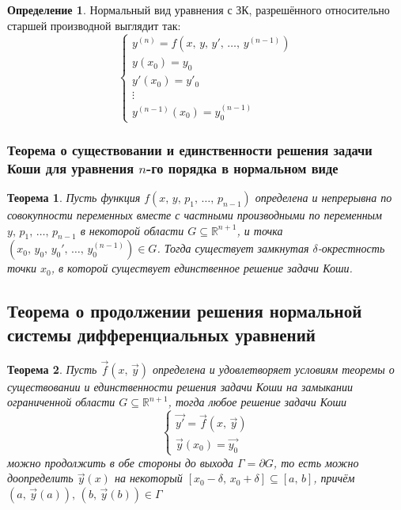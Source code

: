 \documentclass[a4paper,12pt]{article}
\theoremstyle{plain}
\newtheorem{theorem}{Теорема}[section]
\theoremstyle{definition}
\newtheorem{definition}{Определение}[section]
\theoremstyle{remark}
\begin{document}
\begin{definition}
	Нормальный вид уравнения с ЗК, разрешённого относительно старшей производной выглядит так:
	\[
		\begin{cases}
			y^{(n)} = f(x,\,y,\,y',\,\ldots,\,y^{(n-1)}) \\
			y(x_0) = y_0                                 \\
			y'(x_0) = y'_0                               \\
			\vdots                                       \\
			y^{(n - 1)}(x_0) = y^{(n-1)}_0
		\end{cases}
	\]
\end{definition}

\subsubsection*{Теорема о существовании и единственности решения задачи Коши для уравнения $n$-го порядка в нормальном виде}
\begin{theorem}
	Пусть функция $f(x,\,y,\,p_1,\,\ldots,\,p_{n-1})$ определена и непрерывна по совокупности переменных вместе с частными производными по переменным $y,\,p_1,\,\ldots,\,p_{n - 1}$ в некоторой области $G \subseteq \mathbb{R}^{n + 1}$, и точка $(x_0,\,y_0,\,y_0',\,\ldots,\,y^{(n-1)}_0) \in G$. Тогда существует замкнутая $\delta$-окрестность точки $x_0$, в которой существует единственное решение задачи Коши.
\end{theorem}

\subsection{Теорема о продолжении решения нормальной системы дифференциальных уравнений}
\begin{theorem}
	Пусть $\vec{f}(x,\,\vec{y})$ определена и удовлетворяет условиям теоремы о существовании и единственности решения задачи Коши на замыкании ограниченной области $G \subseteq \mathbb{R}^{n + 1}$, тогда любое решение задачи Коши
	\[
		\begin{cases}
			\vec{y'} = \vec{f}(x,\,\vec{y}) \\
			\vec{y}(x_0) = \vec{y_0}
		\end{cases}
	\]
	можно продолжить в обе стороны до выхода $\Gamma = \partial G$, то есть можно доопределить $\vec{y}(x)$ на некоторый $[x_0 - \delta,\,x_0 + \delta] \subseteq [a,\,b]$, причём $(a,\,\vec{y}(a)),\, (b,\,\vec{y}(b)) \in \Gamma$
\end{theorem}
\end{document}
